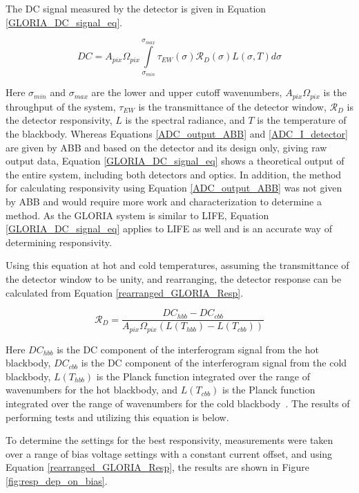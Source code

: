 The DC signal measured by the detector is given in Equation \ref{GLORIA_DC_signal_eq}.

\begin{equation} \label{GLORIA_DC_signal_eq}
    DC = A_{pix}\Omega_{pix}\int\limits_{\sigma_{min}}^{\sigma_{max}}\tau_{EW}(\sigma)\mathcal{R}_D(\sigma)L(\sigma, T)d\sigma
\end{equation}

Here $\sigma_{min}$ and $\sigma_{max}$ are the lower and upper cutoff wavenumbers, $A_{pix}\Omega_{pix}$ is the throughput of the system, $\tau_{EW}$ is the transmittance of the detector window, $\mathcal{R}_D$ is the detector responsivity, $L$ is the spectral radiance, and $T$ is the temperature of the blackbody. Whereas Equations \ref{ADC_output_ABB} and \ref{ADC_I_detector} are given by ABB and based on the detector and its design only, giving raw output data, Equation \ref{GLORIA_DC_signal_eq} shows a theoretical output of the entire system, including both detectors and optics. In addition, the method for calculating responsivity using Equation \ref{ADC_output_ABB} was not given by ABB and would require more work and characterization to determine a method. As the GLORIA system is similar to LIFE, Equation \ref{GLORIA_DC_signal_eq} applies to LIFE as well and is an accurate way of determining responsivity.

Using this equation at hot and cold temperatures, assuming the transmittance of the detector window to be unity, and rearranging, the detector response can be calculated from Equation \ref{rearranged_GLORIA_Resp}.

\begin{equation} \label{rearranged_GLORIA_Resp}
    \mathcal{R}_D = \frac{DC_{hbb} - DC_{cbb}}{A_{pix}\Omega_{pix}(L(T_{hbb})-L(T_{cbb}))}
\end{equation}

Here $DC_{hbb}$ is the DC component of the interferogram signal from the hot blackbody, $DC_{cbb}$ is the DC component of the interferogram signal from the cold blackbody, $L(T_{hbb})$ is the Planck function integrated over the range of wavenumbers for the hot blackbody, and $L(T_{cbb})$ is the Planck function integrated over the range of wavenumbers for the cold blackbody~\cite{GLORIA_PhD}. The results of performing tests and utilizing this equation is below.

To determine the settings for the best responsivity, measurements were taken over a range of bias voltage settings with a constant current offset, and using Equation \ref{rearranged_GLORIA_Resp}, the results are shown in Figure \ref{fig:resp_dep_on_bias}.

